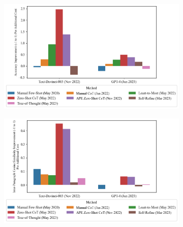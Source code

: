 \documentclass[11pt]{article}
\begin{document}
\begin{figure}
  \caption{Gains Per Cent v. Direct Prompting}
  \begin{subfigure}[h]{0.4925\textwidth}
      \centering
      \includegraphics[width=0.95\hsize]{../Output/gsm8k_change_in_accuracy_quality_per_change_in_cost_sorted_by_technique_age.png} 
  \end{subfigure}
  \begin{subfigure}[h]{0.4925\textwidth}
      \centering
      \includegraphics[width=0.95\hsize]{../Output/cw_change_in_accuracy_quality_per_change_in_cost_sorted_by_technique_age_transformed.png}
  \end{subfigure}
  \hfill
  \label{fig:gains_v_dp_cost}
\end{figure}

\end{document}
